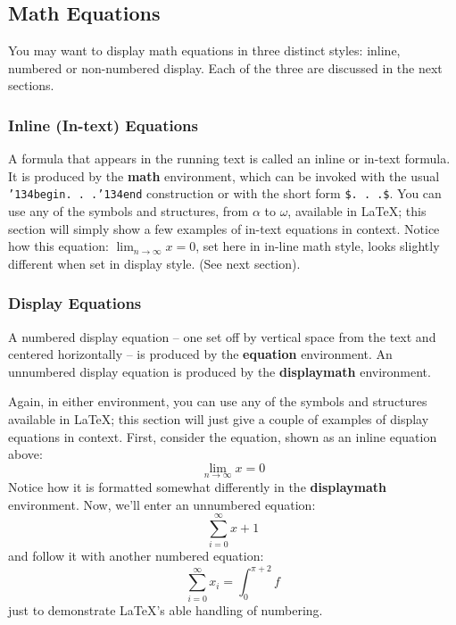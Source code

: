 \documentclass{nime-alternate}
\begin{document}
\subsection{Math Equations}
You may want to display math equations in three distinct styles:
inline, numbered or non-numbered display.  Each of
the three are discussed in the next sections.

\subsubsection{Inline (In-text) Equations}
A formula that appears in the running text is called an
inline or in-text formula.  It is produced by the
\textbf{math} environment, which can be
invoked with the usual \texttt{{\char'134}begin. . .{\char'134}end}
construction or with the short form \texttt{\$. . .\$}. You
can use any of the symbols and structures,
from $\alpha$ to $\omega$, available in
\LaTeX \cite{Lamport:LaTeX}; this section will simply show a
few examples of in-text equations in context. Notice how
this equation: \begin{math}\lim_{n\rightarrow \infty}x=0\end{math},
set here in in-line math style, looks slightly different when
set in display style.  (See next section).

\subsubsection{Display Equations}
A numbered display equation -- one set off by vertical space
from the text and centered horizontally -- is produced
by the \textbf{equation} environment. An unnumbered display
equation is produced by the \textbf{displaymath} environment.

Again, in either environment, you can use any of the symbols
and structures available in \LaTeX; this section will just
give a couple of examples of display equations in context.
First, consider the equation, shown as an inline equation above:
\begin{equation}\lim_{n\rightarrow \infty}x=0\end{equation}
Notice how it is formatted somewhat differently in
the \textbf{displaymath}
environment.  Now, we'll enter an unnumbered equation:
\begin{displaymath}\sum_{i=0}^{\infty} x + 1\end{displaymath}
and follow it with another numbered equation:
\begin{equation}\sum_{i=0}^{\infty}x_i=\int_{0}^{\pi+2} f\end{equation}
just to demonstrate \LaTeX's able handling of numbering.
\end{document}
